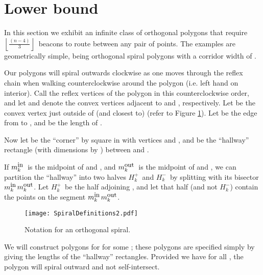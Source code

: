\documentclass{article}
\newcommand{\floor}[2]{\ensuremath{\left \lfloor {\frac{#1}{#2}} \right
\rfloor}}
\begin{document}
		 
\section{Lower bound} 

\newcommand{\mXin}[1]{\ensuremath{m_{#1}^{\mbox{\small in}}}}
\newcommand{\mXout}[1]{\ensuremath{m_{#1}^{\mbox{\small out}}}} 
\newcommand{\mkin}{\mXin{k}}		
\newcommand{\mkout}{\mXout{k}}
\newcommand{\mimin}{\mXin{3i-2}}
\newcommand{\mimout}{\mXout{3i-2}}
\newcommand{\mipin}{\mXin{3i+1}}
\newcommand{\mipout}{\mXout{3i+1}}
\newcommand{\Hp}[1]{\ensuremath{H^{+}_{#1}}}
\newcommand{\Hm}[1]{\ensuremath{H^{-}_{#1}}}

	In this section we exhibit an infinite class of orthogonal polygons
	that require
	\floor{(n-4)}{3}\ beacons to route between any pair of points.
	The examples are geometrically simple, being orthogonal spiral
	polygons with a corridor width of .

	Our polygons will spiral outwards clockwise as one moves through the reflex
	chain when walking counterclockwise around the polygon (i.e. left hand on
	interior).
	Call the reflex vertices of the polygon  in
	this counterclockwise order, and let  and  denote the convex
	vertices adjacent to  and , respectively.
	Let  be the convex vertex just outside of (and closest to) 
	(refer to Figure \ref{fig:spiralDefinitions}).
	Let  be the edge from  to , and  be the length of .
	

	Now let  be the ``corner''  by  square in  with vertices  and
	, and  be the ``hallway'' rectangle (with dimensions  by )
	between  and .
	
	
	If \mkin\  is the midpoint of  and ,
	and \mkout\  is the midpoint of  and ,
	we can partition the ``hallway''  into two halves \Hp{k}\ and \Hm{k}\ 
	by splitting with its bisector \mkin\mkout.
	Let \Hp{k}\ be the half adjoining , and
	let that half (and not \Hm{k}) contain the points on the segment
	\mkin\mkout.

\begin{figure}[htb]
	\begin{center}
		\texttt{[image: SpiralDefinitions2.pdf]}
	\end{center}
	\caption{ Notation for an orthogonal spiral. }
	\label{fig:spiralDefinitions}
\end{figure}

We will construct polygons for  for some ; these polygons
are specified simply by giving the lengths  
of the  ``hallway'' rectangles.
Provided we have  for all , the polygon
will spiral outward and not self-intersect.
\end{document}
